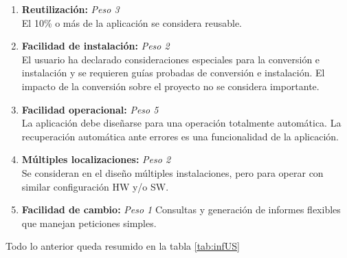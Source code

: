 \documentclass[11pt,a4paper,spanish,twoside]{book}
\begin{document}
\begin{enumerate}[{\bf 1.}]
\item {\bf Reutilización:} \emph{Peso 3} \\ El 10\% o más de la aplicación se
  considera reusable. 

\item {\bf Facilidad de instalación:} \emph{Peso 2} \\ El usuario ha declarado
  consideraciones especiales para la conversión e instalación y se requieren
  guías probadas de conversión e instalación. El impacto de la conversión
  sobre el proyecto no se considera importante. 

\item {\bf Facilidad operacional:} \emph{Peso 5} \\ La aplicación debe diseñarse
  para una operación totalmente automática. La recuperación automática ante
  errores es una funcionalidad de la aplicación. 

\item {\bf Múltiples localizaciones:} \emph{Peso 2} \\ Se consideran en el
  diseño múltiples instalaciones, pero para operar con similar configuración
  HW y/o SW.

\item {\bf Facilidad de cambio:} \emph{Peso 1} Consultas y generación de
  informes flexibles que manejan peticiones simples.

\end{enumerate}

Todo lo anterior queda resumido en la tabla \ref{tab:infUS}
\end{document}

